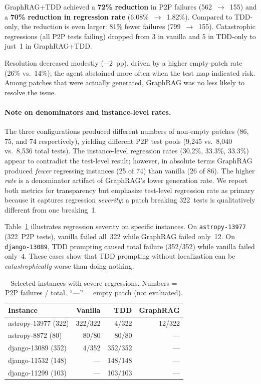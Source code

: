 \documentclass[sigconf,nonacm]{acmart}
\begin{document}
GraphRAG+TDD achieved a \textbf{72\% reduction} in P2P failures
(562~$\to$~155) and a \textbf{70\% reduction in regression rate}
(6.08\%~$\to$~1.82\%).  Compared to TDD-only, the reduction is even
larger: 81\% fewer failures (799~$\to$~155).  Catastrophic regressions
(all P2P tests failing) dropped from 3 in vanilla and 5 in TDD-only
to just~1 in GraphRAG+TDD.

Resolution decreased modestly ($-2$~pp), driven by a higher empty-patch rate
(26\% vs.\ 14\%); the agent abstained more often when the test map indicated
risk.  Among patches that were actually generated, GraphRAG was no less likely
to resolve the issue.

\paragraph{Note on denominators and instance-level rates.}
The three configurations produced different numbers of non-empty patches
(86, 75, and 74 respectively), yielding different P2P test pools
(9{,}245 vs.\ 8{,}040 vs.\ 8{,}536 total tests).  The instance-level
regression rates (30.2\%, 33.3\%, 33.3\%) appear to contradict the
test-level result; however, in absolute terms GraphRAG produced
\emph{fewer} regressing instances (25 of 74) than vanilla (26 of 86).
The higher \emph{rate} is a denominator artifact of GraphRAG's lower
generation rate.  We report both metrics for transparency but emphasize
test-level regression rate as primary because it captures regression
\emph{severity}: a patch breaking 322~tests is qualitatively different
from one breaking~1.

Table~\ref{tab:catastrophic} illustrates regression severity on
specific instances.  On \texttt{astropy\hbox{-}13977} (322~P2P tests),
vanilla failed all~322 while GraphRAG failed only~12.  On
\texttt{django\hbox{-}13089}, TDD prompting caused total failure
(352/352) while vanilla failed only~4.  These cases show that TDD
prompting without localization can be \emph{catastrophically} worse
than doing nothing.

\begin{table}[t]
\caption{Selected instances with severe regressions.  Numbers = P2P failures /
  total.  ``---'' = empty patch (not evaluated).}
\label{tab:catastrophic}
\small
\begin{tabular}{@{}lrrr@{}}
\toprule
\textbf{Instance} & \textbf{Vanilla} & \textbf{TDD} & \textbf{GraphRAG} \\
\midrule
astropy-13977 (322)   & 322/322 & 4/322   & 12/322 \\
astropy-8872 (80)     & 80/80   & 80/80   & --- \\
django-13089 (352)    & 4/352   & 352/352 & --- \\
django-11532 (148)    & ---     & 148/148 & --- \\
django-11299 (103)    & ---     & 103/103 & --- \\
\bottomrule
\end{tabular}
\end{table}
\end{document}
